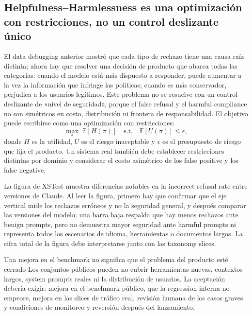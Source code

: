 \subsection{Helpfulness--Harmlessness es una optimización con restricciones, no un control deslizante único}

El data debugging anterior mostró que cada tipo de rechazo tiene una causa raíz distinta; ahora hay que resolver una decisión de producto que abarca todas las categorías: cuando el modelo está más dispuesto a responder, puede aumentar a la vez la información que infringe las políticas; cuando es más conservador, perjudica a los usuarios legítimos. Este problema no se resuelve con un control deslizante de «nivel de seguridad», porque el false refusal y el harmful compliance no son simétricos en costo, distribución ni frontera de responsabilidad. El objetivo puede escribirse como una optimización con restricciones:
\[
\max_{\pi}\;\mathbb{E}[H(\pi)]
\quad \text{s.t.}\quad
\mathbb{E}[U(\pi)]\le \epsilon,
\]
donde $H$ es la utilidad, $U$ es el riesgo inaceptable y $\epsilon$ es el presupuesto de riesgo que fija el producto. Un sistema real también debe establecer restricciones distintas por dominio y considerar el costo asimétrico de los false positive y los false negative.



La figura de XSTest muestra diferencias notables en la incorrect refusal rate entre versiones de Claude. Al leer la figura, primero hay que confirmar que el eje vertical mide los rechazos erróneos y no la seguridad general, y después comparar las versiones del modelo; una barra baja respalda que hay menos rechazos ante benign prompts, pero no demuestra mayor seguridad ante harmful prompts ni representa todos los escenarios de idioma, herramientas o documentos largos. La cifra total de la figura debe interpretarse junto con las taxonomy slices.

\begin{warningbox}{Una mejora en el benchmark no significa que el problema del producto esté cerrado}
Los conjuntos públicos pueden no cubrir herramientas nuevas, contextos largos, system prompts reales ni la distribución de usuarios. La aceptación debería exigir: mejora en el benchmark público, que la regression interna no empeore, mejora en las slices de tráfico real, revisión humana de los casos graves y condiciones de monitoreo y reversión después del lanzamiento.
\end{warningbox}

